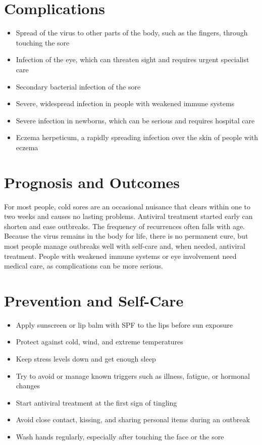 \section*{Complications}
\begin{itemize}
    \item Spread of the virus to other parts of the body, such as the fingers, through touching the sore
    \item Infection of the eye, which can threaten sight and requires urgent specialist care
    \item Secondary bacterial infection of the sore
    \item Severe, widespread infection in people with weakened immune systems
    \item Severe infection in newborns, which can be serious and requires hospital care
    \item Eczema herpeticum, a rapidly spreading infection over the skin of people with eczema
\end{itemize}

\section*{Prognosis and Outcomes}
For most people, cold sores are an occasional nuisance that clears within one to two weeks and causes no lasting problems. Antiviral treatment started early can shorten and ease outbreaks. The frequency of recurrences often falls with age. Because the virus remains in the body for life, there is no permanent cure, but most people manage outbreaks well with self-care and, when needed, antiviral treatment. People with weakened immune systems or eye involvement need medical care, as complications can be more serious.

\section*{Prevention and Self-Care}
\begin{itemize}
    \item Apply sunscreen or lip balm with SPF to the lips before sun exposure
    \item Protect against cold, wind, and extreme temperatures
    \item Keep stress levels down and get enough sleep
    \item Try to avoid or manage known triggers such as illness, fatigue, or hormonal changes
    \item Start antiviral treatment at the first sign of tingling
    \item Avoid close contact, kissing, and sharing personal items during an outbreak
    \item Wash hands regularly, especially after touching the face or the sore
\end{itemize}
